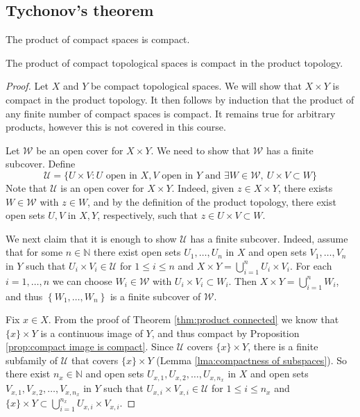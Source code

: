 \documentclass[a4paper]{article}
\begin{document}
\subsection{Tychonov's theorem}
The product of compact spaces is compact. 
\begin{theorem}\label{thm:Tychonov}
    The product of compact topological spaces is compact in the product topology.
\end{theorem}
\begin{proof}
    Let $X$ and $Y$ be compact topological spaces. We will show that $X \times Y$ is compact in the product topology. It then follows by induction that the product of any finite number of compact spaces is compact. It remains true for arbitrary products, however this is not covered in this course.

Let $\mathcal{W}$ be an open cover for $X \times Y$. We need to show that $\mathcal{W}$ has a finite subcover. Define
$$
\mathcal{U}=\{U \times V: U \text { open in } X, V \text { open in } Y \text { and } \exists W \in \mathcal{W},\ U \times V \subset W\}
$$
Note that $\mathcal{U}$ is an open cover for $X \times Y$. Indeed, given $z \in X \times Y$, there exists $W \in \mathcal{W}$ with $z \in W$, and by the definition of the product topology, there exist open sets $U, V$ in $X, Y$, respectively, such that $z \in U \times V \subset W$.

We next claim that it is enough to show $\mathcal{U}$ has a finite subcover. Indeed, assume that for some $n \in \mathbb{N}$ there exist open sets $U_{1}, \ldots, U_{n}$ in $X$ and open sets $V_{1}, \ldots, V_{n}$ in $Y$ such that $U_{i} \times V_{i} \in \mathcal{U}$ for $1 \leqslant i \leqslant n$ and $X \times Y=\bigcup_{i=1}^{n} U_{i} \times V_{i}$. For each $i=1, \ldots, n$ we can choose $W_{i} \in \mathcal{W}$ with $U_{i} \times V_{i} \subset W_{i}$. Then $X \times Y=\bigcup_{i=1}^{n} W_{i}$, and thus $\left\{W_{1}, \ldots, W_{n}\right\}$ is a finite subcover of $\mathcal{W}$.

Fix $x \in X$. From the proof of Theorem \ref{thm:product connected} we know that $\{x\} \times Y$ is a continuous image of $Y$, and thus compact by Proposition \ref{prop:compact image is compact}. Since $\mathcal{U}$ covers $\{x\} \times Y$, there is a finite subfamily of $\mathcal{U}$ that covers $\{x\} \times Y$ (Lemma \ref{lma:compactness of subspaces}). So there exist $n_{x} \in \mathbb{N}$ and open sets $U_{x, 1}, U_{x, 2}, \ldots, U_{x, n_{x}}$ in $X$ and open sets $V_{x, 1}, V_{x, 2}, \ldots, V_{x, n_{x}}$ in $Y$ such that $U_{x, i} \times V_{x, i} \in \mathcal{U}$ for $1 \leqslant i \leqslant n_{x}$ and $\{x\} \times Y \subset \bigcup_{i=1}^{n_{x}} U_{x, i} \times V_{x, i}$. 


\end{proof}
\end{document}
